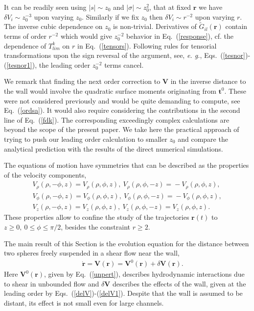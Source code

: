 It can be readily seen using $|s|\sim z_0$ and $|\sigma| \sim z_0^2$, that at fixed $\bm r$ we have $\delta V_i \sim z_0^{-3}$ upon varying $z_0$. Similarly if we fix $z_0$ then $\delta V_i \sim r^{-2}$ upon varying $r$. The inverse cubic dependence on $z_0$ is non-trivial. Derivatives of ${\tilde G}_{il}(\bm r)$ contain terms of order $r^{-2}$ which would give $z_0^{-2}$ behavior in Eq.~(\ref{response}), cf. the dependence of $T^k_{lim}$ on $r$ in Eq.~(\ref{tensors}). Following rules for tensorial transformations upon the sign reversal of the argument, see, {\it e. g.}, Eqs.~(\ref{tesnor})-(\ref{tesnor1}), the leading order $z_0^{-2}$ terms cancel.

We remark that finding the next order correction to $\bm V$ in the inverse distance to the wall would involve the quadratic surface moments originating from $\bm t^0$. These were not considered previously and would be quite demanding to compute, see Eq.~(\ref{ordsa}). It would also require considering the contributions in the second line of Eq.~(\ref{fdk}). The corresponding exceedingly complex calculations are beyond the scope of the present paper. We take here the practical approach of trying to push our leading order calculation to smaller $z_0$ and compare the analytical prediction with the results of the direct numerical simulations.

The equations of motion have symmetries that can be described as the properties of the velocity components,
\begin{equation} \begin{aligned}  %
V_{\rho}(\rho,-\phi,z)\!=\!V_{\rho}(\rho,\phi,z),\
V_{\rho}(\rho,\phi,-z)\!=\!-V_{\rho}(\rho,\phi,z),\\
V_{\phi}(\rho,-\phi,z)\!=\!V_{\phi}(\rho,\phi,z),\
V_{\phi}(\rho,\phi,-z)\!=\!-V_{\phi}(\rho,\phi,z),
\\
V_{z}(\rho,-\phi,z)\!=\!V_{z}(\rho,\phi,z),\
V_{z}(\rho,\phi,-z)\!=\!V_{z}(\rho,\phi,z).
\label{symmetriesCyl}
\end{aligned}
  \end{equation}
These properties allow to confine the study of the trajectories $\bm r(t)$ to $z \ge 0,\ 0\le\phi\le\pi/2$, besides the constraint $r\ge 2$.


The main result of this Section is the evolution equation for the distance between two spheres freely suspended in a shear flow near the wall,
\begin{eqnarray}&&\!\!\!\!\!\!\!\!\!\!\!\!\!\!\!\!
\dot{\bm r}=\bm V(\bm r)=\bm V^0(\bm r)+\delta \bm V(\bm r).
\end{eqnarray}
Here $\bm V^0(\bm r)$, given by Eq.~(\ref{unpert}), describes hydrodynamic interactions due to shear in unbounded flow and $\delta \bm V$ describes the effects of the wall, given at the leading order
by Eqs.~(\ref{delV})-(\ref{delV1}). Despite that the wall is assumed to be distant, its effect
is not small even for large channels.


